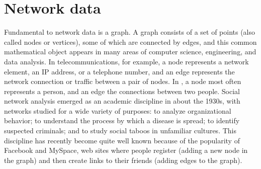 






\section{Network data}



   Fundamental to
network data is a graph. A graph consists of a set of points (also
called nodes or vertices), some of which are connected by edges, and
this common mathematical object appears in many areas of computer
science, engineering, and data analysis.  In telecommunications, for
example, a node represents a network element, an IP address, or a
telephone number, and an edge represents the network connection or
traffic between a pair of nodes.  In 
\cite{Wasserman94},  a node most often
represents a person, and an edge the connections between two people.
Social network analysis emerged as an academic discipline in about the
1930s, with networks studied for a wide variety of purposes: to
analyze organizational behavior; to understand the process by which a
disease is spread; to identify suspected criminals; and to study social
taboos in unfamiliar cultures.  This discipline has recently become
quite well known because of the popularity of
Facebook\textsuperscript{\textregistered} and
MySpace\textsuperscript{\textregistered}, web sites where people
register (adding a new node in the graph) and then create links to
their friends (adding edges to the graph).

